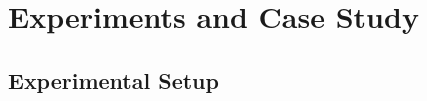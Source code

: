 \documentclass[12pt,a4paper]{article}
\begin{document}
%
%
%
%
%
%
%
%

\section{Experiments and Case Study}

\subsection{Experimental Setup}
\end{document}
